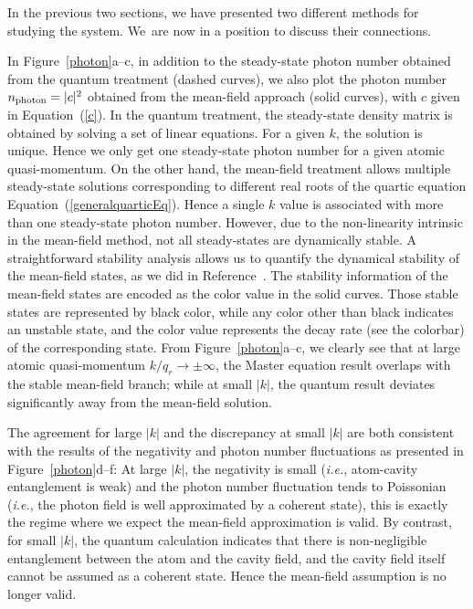 \documentclass[atoms,article,accept,moreauthors,pdftex,12pt,a4paper]{mdpi}
\begin{document}
In the previous two sections, we have presented two different methods for studying the system. We~are now in a position to discuss their connections.

In Figure~\ref{photon}a--c, in addition to the steady-state photon number obtained from the quantum treatment (dashed curves), we also plot the photon number $n_{\rm photon}=|c|^2$ obtained from the mean-field approach (solid curves), with $c$ given in Equation~(\ref{c}). In the quantum treatment, the steady-state density matrix is obtained by solving a set of linear equations. For a given $k$, the solution is unique. Hence we only get one steady-state photon number for a given atomic quasi-momentum. On the other hand, the mean-field treatment allows multiple steady-state solutions corresponding to different real roots of the quartic equation Equation~(\ref{generalquarticEq}). Hence a single $k$ value is associated with more than one steady-state photon number. However, due to the non-linearity intrinsic in the mean-field method, not all steady-states are dynamically stable. A straightforward stability analysis allows us to quantify the dynamical stability of the mean-field states, as we did in Reference~\cite{cavitySOC}. The stability information of the mean-field states are encoded as the color value in the solid curves. Those stable states are represented by black color, while any color other than black indicates an unstable state, and the color value represents the decay rate (see the colorbar) of the corresponding state. From Figure~\ref{photon}a--c, we clearly see that at large atomic quasi-momentum $k/q_r \rightarrow  \pm \infty$, the Master equation result overlaps with the stable mean-field branch; while at small $|k|$, the quantum result deviates significantly away from the mean-field solution.

The agreement for large $|k|$ and the discrepancy at small $|k|$ are both consistent with the results of the negativity and photon number fluctuations as presented in Figure~\ref{photon}d--f: At large $|k|$, the negativity is small (\emph{i.e.}, atom-cavity entanglement is weak) and the photon number fluctuation tends to Poissonian (\emph{i.e.}, the photon field is well approximated by a coherent state), this is exactly the regime where we expect the mean-field approximation is valid. By contrast, for small $|k|$, the quantum calculation indicates that there is non-negligible entanglement between the atom and the cavity field, and the cavity field itself cannot be assumed as a coherent state. Hence the mean-field assumption is no longer valid.
\end{document}
